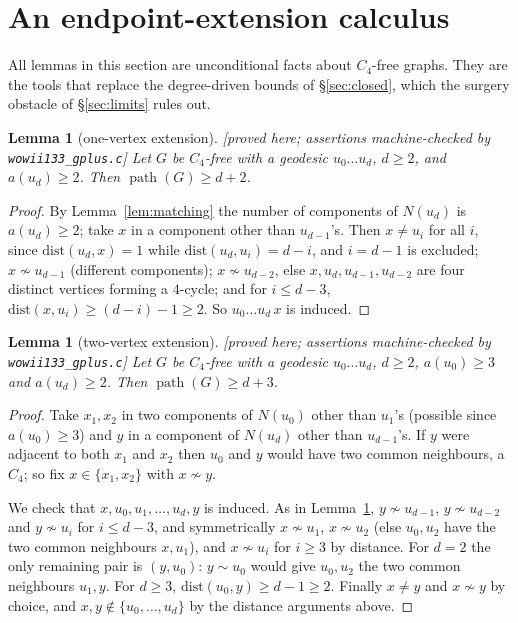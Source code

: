 \documentclass[11pt]{article}
\theoremstyle{plain}
\newtheorem{lemma}[theorem]{Lemma}
\theoremstyle{definition}
\theoremstyle{remark}
\numberwithin{equation}{section}
\newcommand{\pth}{\operatorname{path}}
\newcommand{\statusbox}[1]{{\small\sloppy\textsf{[#1]}}}
\newcommand{\PRV}[1]{\statusbox{proved here; assertions machine-checked by \texttt{#1}}}
\begin{document}
\section{An endpoint-extension calculus}\label{sec:calculus}

All lemmas in this section are unconditional facts about $C_4$-free graphs. They are the
tools that replace the degree-driven bounds of \S\ref{sec:closed}, which the surgery obstacle
of \S\ref{sec:limits} rules out.

\begin{lemma}[one-vertex extension]\label{lem:g10}
\PRV{wowii133\_gplus.c}
Let $G$ be $C_4$-free with a geodesic $u_0 \dots u_d$, $d \ge 2$, and $a(u_d) \ge 2$. Then
$\pth(G) \ge d+2$.
\end{lemma}

\begin{proof}
By Lemma~\ref{lem:matching} the number of components of $N(u_d)$ is $a(u_d) \ge 2$; take $x$
in a component other than $u_{d-1}$'s. Then $x \ne u_i$ for all $i$, since
$\mathrm{dist}(u_d,x) = 1$ while $\mathrm{dist}(u_d,u_i) = d-i$, and $i = d-1$ is excluded;
$x \not\sim u_{d-1}$ (different components); $x \not\sim u_{d-2}$, else
$x, u_d, u_{d-1}, u_{d-2}$ are four distinct vertices forming a $4$-cycle; and for
$i \le d-3$, $\mathrm{dist}(x,u_i) \ge (d-i)-1 \ge 2$. So $u_0 \dots u_d\,x$ is induced.
\end{proof}

\begin{lemma}[two-vertex extension]\label{lem:g1}
\PRV{wowii133\_gplus.c}
Let $G$ be $C_4$-free with a geodesic $u_0\dots u_d$, $d \ge 2$, $a(u_0) \ge 3$ and
$a(u_d) \ge 2$. Then $\pth(G) \ge d+3$.
\end{lemma}

\begin{proof}
Take $x_1, x_2$ in two components of $N(u_0)$ other than $u_1$'s (possible since
$a(u_0) \ge 3$) and $y$ in a component of $N(u_d)$ other than $u_{d-1}$'s. If $y$ were
adjacent to both $x_1$ and $x_2$ then $u_0$ and $y$ would have two common neighbours, a
$C_4$; so fix $x \in \{x_1,x_2\}$ with $x \not\sim y$.

We check that $x, u_0, u_1, \dots, u_d, y$ is induced. As in Lemma~\ref{lem:g10},
$y \not\sim u_{d-1}$, $y\not\sim u_{d-2}$ and $y \not\sim u_i$ for $i \le d-3$, and
symmetrically $x \not\sim u_1$, $x \not\sim u_2$ (else $u_0, u_2$ have the two common
neighbours $x, u_1$), and $x \not\sim u_i$ for $i \ge 3$ by distance. For $d = 2$ the only
remaining pair is $(y,u_0)$: $y \sim u_0$ would give $u_0, u_2$ the two common neighbours
$u_1, y$. For $d \ge 3$, $\mathrm{dist}(u_0,y) \ge d - 1 \ge 2$. Finally $x \ne y$ and
$x \not\sim y$ by choice, and $x, y \notin \{u_0,\dots,u_d\}$ by the distance arguments
above.
\end{proof}
\end{document}
